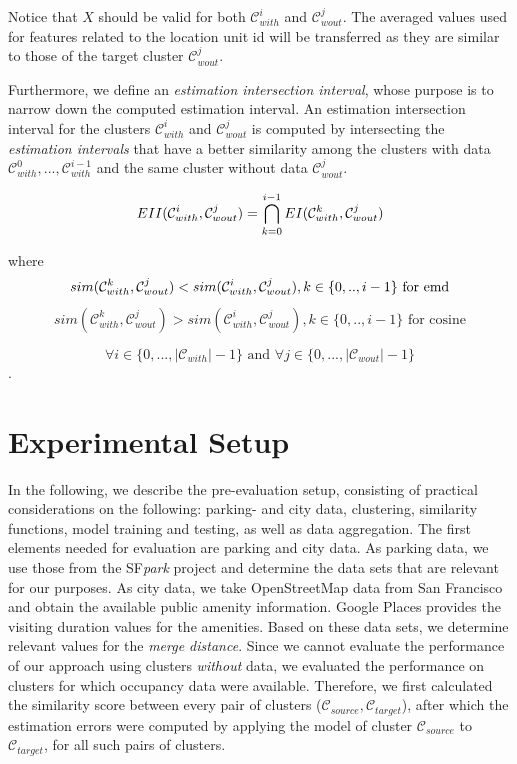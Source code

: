 Notice that $X$ should be valid for both $\mathcal{C}_{with}^i$ and $\mathcal{C}_{wout}^j$. The averaged values used for features related to the location unit id will be transferred as they are similar to those of the target cluster $\mathcal{C}_{wout}^j$.

Furthermore, we define an \textit{estimation intersection interval}, whose purpose is to narrow down the computed estimation interval.
An estimation intersection interval for the clusters $\mathcal{C}_{with}^i$ and $\mathcal{C}_{wout}^j$ is computed by intersecting the \textit{estimation intervals} that have a better similarity among the clusters with data $\mathcal{C}_{with}^{0}, ..., \mathcal{C}_{with}^{i-1}$ and the same cluster without data $\mathcal{C}_{wout}^j$.

\begin{equation}
EII(\mathcal{C}_{with}^i,\mathcal{C}_{wout}^j) = \bigcap_{k=0}^{i-1} EI(\mathcal{C}_{with}^k,\mathcal{C}_{wout}^j) \\
\end{equation}

where
\begin{equation}
sim(\mathcal{C}_{with}^k,\mathcal{C}_{wout}^j) < sim(\mathcal{C}_{with}^i,\mathcal{C}_{wout}^j), k \in \{0,..,i - 1\} \text{ for emd}\\
\end{equation}
\begin{equation}
sim(\mathcal{C}_{with}^k,\mathcal{C}_{wout}^j) > sim(\mathcal{C}_{with}^i,\mathcal{C}_{wout}^j), k \in \{0,..,i - 1\} \text{ for cosine} 
\end{equation}

$$\forall i \in \{0,...,|\mathcal{C}_{with}|-1\} \text{ and } \forall j \in \{0,...,|\mathcal{C}_{wout}|-1\}$$.

\section{Experimental Setup}
In the following, we describe the pre-evaluation setup, consisting of practical considerations on the following: parking- and city data, clustering, similarity functions, model training and testing, as well as data aggregation.
The first elements needed for evaluation are parking and city data. As parking data, we use those from the SF\textit{park} project and determine the data sets that are relevant for our purposes. As city data, we take OpenStreetMap data from San Francisco and obtain the available public amenity information. Google Places provides the visiting duration values for the amenities. Based on these data sets, we determine relevant values for the \textit{merge distance}. Since we cannot evaluate the performance of our approach using clusters \textit{without} data, we evaluated the performance on clusters for which occupancy data were available. 
Therefore, we first calculated the similarity score between every pair of clusters ($\mathcal{C}_{source}, \mathcal{C}_{target}$), after which the estimation errors were computed by applying the model of cluster $\mathcal{C}_{source}$ to $\mathcal{C}_{target}$, for all such pairs of clusters.


